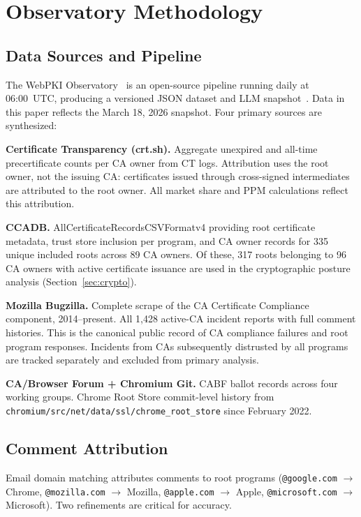 \documentclass[10pt,twocolumn,letterpaper]{article}
\begin{document}
\section{Observatory Methodology}
\label{sec:methodology}

\subsection{Data Sources and Pipeline}
The WebPKI Observatory~\cite{github} is an open-source pipeline running
daily at 06:00~UTC, producing a versioned JSON dataset and LLM
snapshot~\cite{snapshot}. Data in this paper reflects the March 18, 2026
snapshot. Four primary sources are synthesized:

\noindent\textbf{Certificate Transparency (crt.sh).}
Aggregate unexpired and all-time precertificate counts per CA owner from
CT logs. Attribution uses the root owner, not the issuing CA: certificates
issued through cross-signed intermediates are attributed to the root owner.
All market share and PPM calculations reflect this attribution.

\noindent\textbf{CCADB.}
AllCertificateRecordsCSVFormatv4 providing root certificate metadata, trust
store inclusion per program, and CA owner records for 335 unique included
roots across 89 CA owners. Of these, 317 roots belonging to 96 CA owners
with active certificate issuance are used in the cryptographic posture
analysis (Section~\ref{sec:crypto}).

\noindent\textbf{Mozilla Bugzilla.}
Complete scrape of the CA Certificate Compliance component, 2014--present.
All 1,428 active-CA incident reports with full comment histories. This is the
canonical public record of CA compliance failures and root program responses.
Incidents from CAs subsequently distrusted by all programs are tracked
separately and excluded from primary analysis.

\noindent\textbf{CA/Browser Forum + Chromium Git.}
CABF ballot records across four working groups. Chrome Root Store
commit-level history from \texttt{chromium/src/net/data/ssl/chrome\_root\_store}
since February 2022.

\subsection{Comment Attribution}
\label{sec:attribution}

Email domain matching attributes comments to root programs
(\texttt{@google.com} $\to$ Chrome, \texttt{@mozilla.com} $\to$ Mozilla,
\texttt{@apple.com} $\to$ Apple, \texttt{@microsoft.com} $\to$ Microsoft).
Two refinements are critical for accuracy.
\end{document}
